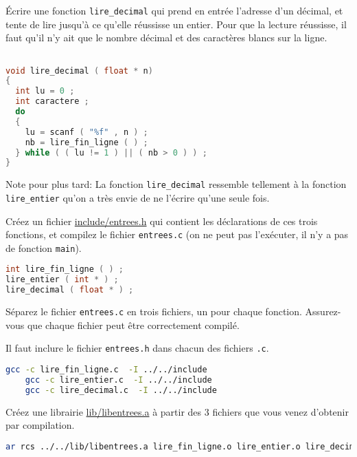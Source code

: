 \question Écrire une fonction \texttt{lire\_decimal} qui prend en
entrée l'adresse d'un décimal, et tente de lire jusqu'à ce qu'elle
réussisse un entier. Pour que la lecture réussisse, il faut qu'il n'y
ait que le nombre décimal et des caractères blancs sur la ligne.

\begin{solutioncachee}
  \begin{lstlisting}[language=C]

void lire_decimal ( float * n) 
{
  int lu = 0 ;
  int caractere ;
  do
  {
    lu = scanf ( "%f" , n ) ;
    nb = lire_fin_ligne ( ) ;
  } while ( ( lu != 1 ) || ( nb > 0 ) ) ;
}
  \end{lstlisting}
  Note pour plus tard: La fonction \texttt{lire\_decimal} ressemble
  tellement à la fonction \texttt{lire\_entier} qu'on a très envie de ne l'écrire 
  qu'une seule fois.
\end{solutioncachee}

\question Créez un fichier \url{include/entrees.h} qui contient les
déclarations de ces trois fonctions, et compilez le fichier
\texttt{entrees.c} (on ne peut pas l'exécuter, il n'y a pas de
fonction \texttt{main}).

\begin{solutioncachee}
  \begin{lstlisting}[language=C]
int lire_fin_ligne ( ) ;
lire_entier ( int * ) ;  
lire_decimal ( float * ) ;     
  \end{lstlisting}
\end{solutioncachee}
\question Séparez le fichier \texttt{entrees.c} en trois fichiers, un
pour chaque fonction. Assurez-vous que chaque fichier peut être
correctement compilé.

\begin{solutioncachee}
  Il faut inclure le fichier \texttt{entrees.h} dans chacun des
  fichiers \texttt{.c}.
  \begin{lstlisting}[language=bash]
    gcc -c lire_fin_ligne.c  -I ../../include
    gcc -c lire_entier.c  -I ../../include
    gcc -c lire_decimal.c  -I ../../include
  \end{lstlisting}
\end{solutioncachee}

\question Créez une librairie \url{lib/libentrees.a} à partir des 3
fichiers que vous venez d'obtenir par compilation.

\begin{solutioncachee}
  \begin{lstlisting}[language=bash]
    ar rcs ../../lib/libentrees.a lire_fin_ligne.o lire_entier.o lire_decimal.o
  \end{lstlisting}
\end{solutioncachee}

